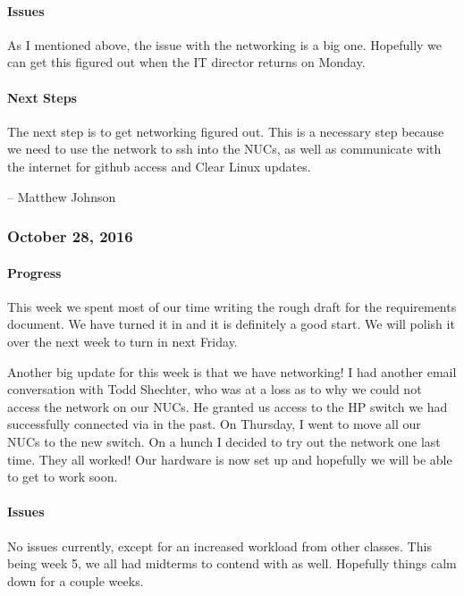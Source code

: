 \documentclass[10pt,onecolumn,journal,draftclsnofoot]{IEEEtran}
\begin{document}
\paragraph{Issues} 

As I mentioned above, the issue with the networking is a big one.
Hopefully we can get this figured out when the IT director returns on
Monday.

\paragraph{Next Steps} 

The next step is to get networking figured out. This is a necessary step
because we need to use the network to ssh into the NUCs, as well as
communicate with the internet for github access and Clear Linux updates.

-- Matthew Johnson

\subsubsection{October 28, 2016} 

\paragraph{Progress} 

This week we spent most of our time writing the rough draft for the
requirements document. We have turned it in and it is definitely a good
start. We will polish it over the next week to turn in next Friday.

Another big update for this week is that we have networking! I had
another email conversation with Todd Shechter, who was at a loss as to
why we could not access the network on our NUCs. He granted us access to
the HP switch we had successfully connected via in the past. On
Thursday, I went to move all our NUCs to the new switch. On a hunch I
decided to try out the network one last time. They all worked! Our
hardware is now set up and hopefully we will be able to get to work
soon.

\paragraph{Issues} 

No issues currently, except for an increased workload from other
classes. This being week 5, we all had midterms to contend with as well.
Hopefully things calm down for a couple weeks.
\end{document}
